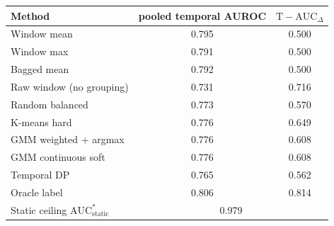 \begin{tabular}{lcc}
\toprule
Method & pooled temporal AUROC & $\mathrm{T\!-\!AUC}_{\Delta}$ \\
\midrule
Window mean & 0.795 & 0.500 \\
Window max & 0.791 & 0.500 \\
Bagged mean & 0.792 & 0.500 \\
Raw window (no grouping) & 0.731 & 0.716 \\
Random balanced & 0.773 & 0.570 \\
K-means hard & 0.776 & 0.649 \\
GMM weighted + argmax & 0.776 & 0.608 \\
GMM continuous soft & 0.776 & 0.608 \\
Temporal DP & 0.765 & 0.562 \\
Oracle label & 0.806 & 0.814 \\
\midrule
Static ceiling $\mathrm{AUC}^*_{\mathrm{static}}$ & \multicolumn{2}{c}{0.979} \\
\bottomrule
\end{tabular}
